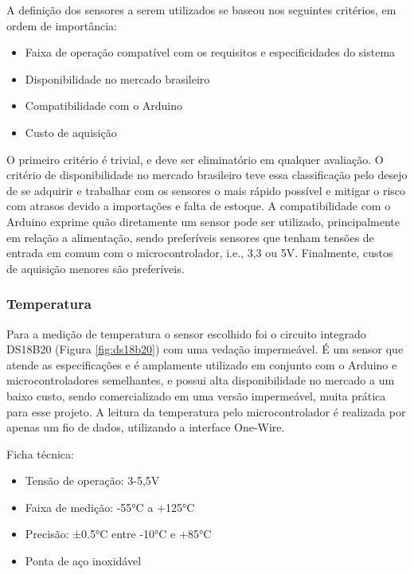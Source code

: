 A definição dos sensores a serem utilizados se baseou nos seguintes critérios, em ordem de importância:

\begin{itemize}
    \item Faixa de operação compatível com os requisitos e especificidades do sistema
    \item Disponibilidade no mercado brasileiro
    \item Compatibilidade com o Arduino
    \item Custo de aquisição
\end{itemize}

O primeiro critério é trivial, e deve ser eliminatório em qualquer avaliação. O critério de disponibilidade no mercado brasileiro teve essa classificação pelo desejo de se adquirir e trabalhar com os sensores o mais rápido possível e mitigar o risco com atrasos devido a importações e falta de estoque. A compatibilidade com o Arduino exprime quão diretamente um sensor pode ser utilizado, principalmente em relação a alimentação, sendo preferíveis sensores que tenham tensões de entrada em comum com o microcontrolador, i.e., 3,3 ou 5V. Finalmente, custos de aquisição menores são preferíveis.

\subsubsection{Temperatura}

Para a medição de temperatura o sensor escolhido foi o circuito integrado DS18B20 (Figura \ref{fig:ds18b20}) com uma vedação impermeável. É um sensor que atende as especificações e é amplamente utilizado em conjunto com o Arduino e microcontroladores semelhantes, e possui alta disponibilidade no mercado a um baixo custo, sendo comercializado em uma versão impermeável, muita prática para esse projeto. A leitura da temperatura pelo microcontrolador é realizada por apenas um fio de dados, utilizando a interface One-Wire. 

Ficha técnica:
\begin{itemize}
    \item Tensão de operação: 3-5,5V
    \item Faixa de medição: -55°C a +125°C
    \item Precisão: ±0.5°C entre -10°C e +85°C
    \item Ponta de aço inoxidável
\end{itemize}

